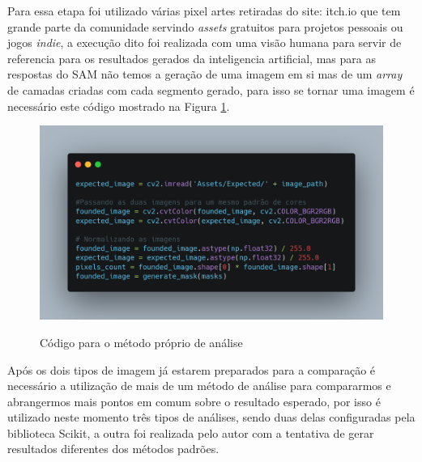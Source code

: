 Para essa etapa foi utilizado várias pixel artes retiradas do site: itch.io que tem grande parte da comunidade servindo \textit{assets} gratuitos para projetos pessoais ou jogos \textit{indie}, a execução dito foi realizada com uma visão humana para servir de referencia para os resultados gerados da inteligencia artificial, mas para as respostas do SAM não temos a geração de uma imagem em si mas de um \textit{array} de camadas criadas com cada segmento gerado, para isso se tornar uma imagem é necessário este código mostrado na Figura \ref{fig:code2}.

\FloatBarrier
\begin{figure}[ht]
    \caption{Código para o método próprio de análise}
    \centering
    \includegraphics[scale=0.25]{imagens/code_part_two.png}
    \label{fig:code2}
\end{figure}
\FloatBarrier

Após os dois tipos de imagem já estarem preparados para a comparação é necessário a utilização de mais de um método de análise para compararmos e abrangermos mais pontos em comum sobre o resultado esperado, por isso é utilizado neste momento três tipos de análises, sendo duas delas configuradas pela biblioteca Scikit, a outra foi realizada pelo autor com a tentativa de gerar resultados diferentes dos métodos padrões.

